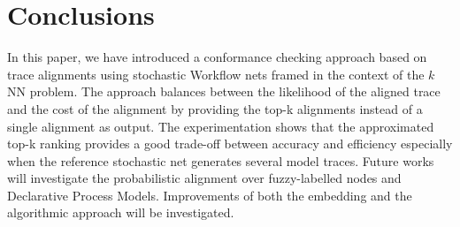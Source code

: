 \section{Conclusions}
\label{sec:conclusion}

In this paper, we have introduced a conformance checking approach based on trace alignments using stochastic Workflow nets framed in the context of the $k$NN problem.
The approach balances between the likelihood of the aligned trace and the cost of the alignment by providing the top-k alignments instead of a single alignment as output. The experimentation shows that the approximated top-k ranking provides a good trade-off between accuracy and efficiency especially when the reference stochastic net generates several model traces.
Future works will investigate the probabilistic alignment over fuzzy-labelled nodes and Declarative Process Models. Improvements of both the embedding and the algorithmic approach will be investigated. 


%
%





